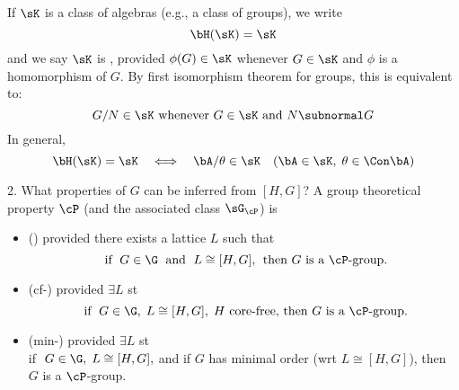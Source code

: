 \begin{frame}[fragile,label=HomImg]{}
If $\sK$ is a class of algebras (e.g., a class of groups), 
we write 
\[\bH(\sK) = \sK\]
and we say
$\sK$ is ,
provided $\phi(G)\in \sK$ whenever $G\in \sK$ and
$\phi$ is a homomorphism of $G$. 
\vskip4mm
By first isomorphism theorem for groups, this is equivalent to: 
\[
\text{$G/N\in \sK$ whenever $G\in \sK$ and $N\subnormal G$}
\]
\vskip4mm
In general,
\[
\bH(\sK) = \sK  \quad \Longleftrightarrow \quad \bA/\theta \in \sK \quad (\bA\in \sK, \; \theta \in \Con\bA)
\]
\end{frame}

\begin{frame}[label=IEProps]{2. What properties of $G$ can be inferred from $[H,G]$?}
A group theoretical property $\cP$  (and the associated class $\sG_\cP$) is
\vskip2mm
\begin{itemize}
\item 
{} (\IE) provided there exists a lattice
$L$ such that
\[
\text{ if $\;G\in \G\;$ and $\;L\cong [H,G],\;$  then $G$ is a $\cP$-group.}
\]
\vskip2mm

\item
{} (cf-\IE) provided
$\exists L$ st
\[
\text{ if $\;G\in \G,\; L\cong [H,G],\;H$ core-free, then $G$ is a $\cP$-group.}
\]
\vskip2mm

\item 
{} (min-\IE)
provided $\exists L$ st\\ 
if $\;G\in \G,\; L\cong [H,G],$ and if $G$ has minimal order (wrt
$L\cong [H,G]$), then $G$ is a $\cP$-group.    
\end{itemize}

\end{frame}


